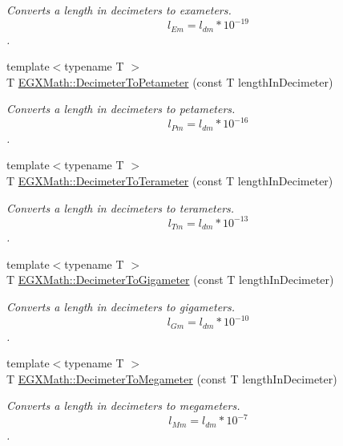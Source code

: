 \begin{DoxyCompactItemize}
\begin{DoxyCompactList}\small\item\em Converts a length in decimeters to exameters. \[ l_{Em}=l_{dm} * 10^{-19} \]. \end{DoxyCompactList}\item 
{\footnotesize template$<$typename T $>$ }\\T \mbox{\hyperlink{group___e_g_x_math-_conversions-_length_conversions-_s_i-_decimeter-_s_i_gaaaaf9805ec7a853f4d9ae242baf3908a}{E\+G\+X\+Math\+::\+Decimeter\+To\+Petameter}} (const T length\+In\+Decimeter)
\begin{DoxyCompactList}\small\item\em Converts a length in decimeters to petameters. \[ l_{Pm}=l_{dm} * 10^{-16} \]. \end{DoxyCompactList}\item 
{\footnotesize template$<$typename T $>$ }\\T \mbox{\hyperlink{group___e_g_x_math-_conversions-_length_conversions-_s_i-_decimeter-_s_i_ga182e057812e247aa0058051c08e29bee}{E\+G\+X\+Math\+::\+Decimeter\+To\+Terameter}} (const T length\+In\+Decimeter)
\begin{DoxyCompactList}\small\item\em Converts a length in decimeters to terameters. \[ l_{Tm}=l_{dm} * 10^{-13} \]. \end{DoxyCompactList}\item 
{\footnotesize template$<$typename T $>$ }\\T \mbox{\hyperlink{group___e_g_x_math-_conversions-_length_conversions-_s_i-_decimeter-_s_i_gab3fcc85ff18a685480d182d95da4d60b}{E\+G\+X\+Math\+::\+Decimeter\+To\+Gigameter}} (const T length\+In\+Decimeter)
\begin{DoxyCompactList}\small\item\em Converts a length in decimeters to gigameters. \[ l_{Gm}=l_{dm} * 10^{-10} \]. \end{DoxyCompactList}\item 
{\footnotesize template$<$typename T $>$ }\\T \mbox{\hyperlink{group___e_g_x_math-_conversions-_length_conversions-_s_i-_decimeter-_s_i_ga093ff7a928de0bc92d2dd57c2c3d0a60}{E\+G\+X\+Math\+::\+Decimeter\+To\+Megameter}} (const T length\+In\+Decimeter)
\begin{DoxyCompactList}\small\item\em Converts a length in decimeters to megameters. \[ l_{Mm}=l_{dm} * 10^{-7} \]. \end{DoxyCompactList}\item 

\end{DoxyCompactItemize}
